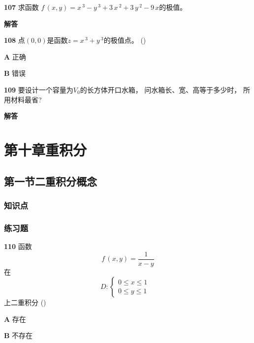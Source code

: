 \documentclass[a4paper,10pt]{article} %
\begin{document}


\textheight


\par\noindent \textbf{107} \quad 求函数
$f\,(x,y)=x\,^3-y\,^3+3\,x\,^2+3\,y\,^2-9\,x$的极值。
\par\noindent \textbf{ 解答}





\textheight


\par\noindent \textbf{108} \quad 
点$(0,0)$是函数$z=x\,^3+y\,^3$的极值点。 \hfill (\quad\quad\quad)
\par\noindent \textbf{A} \quad 正确
\par\noindent \textbf{B} \quad 错误





\textheight


\par\noindent \textbf{109} \quad 要设计一个容量为$V_0$的长方体开口水箱， 
问水箱长、宽、高等于多少时， 所用材料最省?
\par\noindent \textbf{ 解答}





\textheight


\newpage
\section{第十章\quad 重积分}
\subsection{第一节\quad 二重积分概念}
\subsubsection{知识点}
\subsubsection{练习题}
\par\noindent \textbf{110} \quad 函数
$$ f\,(x,y)=\frac{1}{x-y}$$
在
\begin{equation*}    D:
 \begin{cases}
    0\leq x\leq 1 &   \\
    0\leq y\leq 1 & 
 \end{cases}                
\end{equation*}
上二重积分 \hfill (\quad\quad\quad)
\par\noindent \textbf{A} \quad 存在
\par\noindent \textbf{B} \quad 不存在
\end{document}
